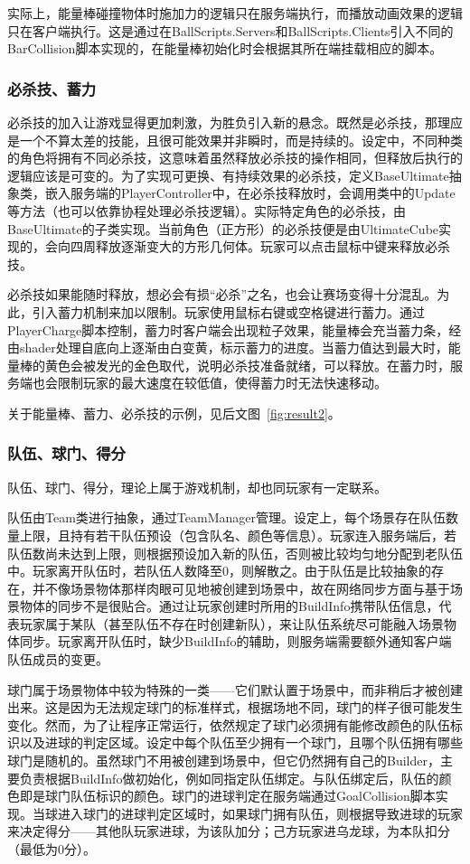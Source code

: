 \documentclass[conference]{IEEEtran}
\begin{document}
实际上，能量棒碰撞物体时施加力的逻辑只在服务端执行，而播放动画效果的逻辑只在客户端执行。这是通过在BallScripts.Servers和BallScripts.Clients引入不同的BarCollision脚本实现的，在能量棒初始化时会根据其所在端挂载相应的脚本。
\subsubsection{必杀技、蓄力}
\quad

必杀技的加入让游戏显得更加刺激，为胜负引入新的悬念。既然是必杀技，那理应是一个不算太差的技能，且很可能效果并非瞬时，而是持续的。设定中，不同种类的角色将拥有不同必杀技，这意味着虽然释放必杀技的操作相同，但释放后执行的逻辑应该是可变的。为了实现可更换、有持续效果的必杀技，定义BaseUltimate抽象类，嵌入服务端的PlayerController中，在必杀技释放时，会调用类中的Update等方法（也可以依靠协程处理必杀技逻辑）。实际特定角色的必杀技，由BaseUltimate的子类实现。当前角色（正方形）的必杀技便是由UltimateCube实现的，会向四周释放逐渐变大的方形几何体。玩家可以点击鼠标中键来释放必杀技。

必杀技如果能随时释放，想必会有损“必杀”之名，也会让赛场变得十分混乱。为此，引入蓄力机制来加以限制。玩家使用鼠标右键或空格键进行蓄力。通过PlayerCharge脚本控制，蓄力时客户端会出现粒子效果，能量棒会充当蓄力条，经由shader处理自底向上逐渐由白变黄，标示蓄力的进度。当蓄力值达到最大时，能量棒的黄色会被发光的金色取代，说明必杀技准备就绪，可以释放。在蓄力时，服务端也会限制玩家的最大速度在较低值，使得蓄力时无法快速移动。

关于能量棒、蓄力、必杀技的示例，见后文图~\ref{fig:result2}。

\subsubsection{队伍、球门、得分}
\quad

队伍、球门、得分，理论上属于游戏机制，却也同玩家有一定联系。

队伍由Team类进行抽象，通过TeamManager管理。设定上，每个场景存在队伍数量上限，且持有若干队伍预设（包含队名、颜色等信息）。玩家连入服务端后，若队伍数尚未达到上限，则根据预设加入新的队伍，否则被比较均匀地分配到老队伍中。玩家离开队伍时，若队伍人数降至0，则解散之。由于队伍是比较抽象的存在，并不像场景物体那样肉眼可见地被创建到场景中，故在网络同步方面与基于场景物体的同步不是很贴合。通过让玩家创建时所用的BuildInfo携带队伍信息，代表玩家属于某队（甚至队伍不存在时创建新队），来让队伍系统尽可能融入场景物体同步。玩家离开队伍时，缺少BuildInfo的辅助，则服务端需要额外通知客户端队伍成员的变更。

球门属于场景物体中较为特殊的一类——它们默认置于场景中，而非稍后才被创建出来。这是因为无法规定球门的标准样式，根据场地不同，球门的样子很可能发生变化。然而，为了让程序正常运行，依然规定了球门必须拥有能修改颜色的队伍标识以及进球的判定区域。设定中每个队伍至少拥有一个球门，且哪个队伍拥有哪些球门是随机的。虽然球门不用被创建到场景中，但它仍然拥有自己的Builder，主要负责根据BuildInfo做初始化，例如同指定队伍绑定。与队伍绑定后，队伍的颜色即是球门队伍标识的颜色。球门的进球判定在服务端通过GoalCollision脚本实现。当球进入球门的进球判定区域时，如果球门拥有队伍，则根据导致进球的玩家来决定得分——其他队玩家进球，为该队加分；己方玩家进乌龙球，为本队扣分（最低为0分）。
\end{document}

